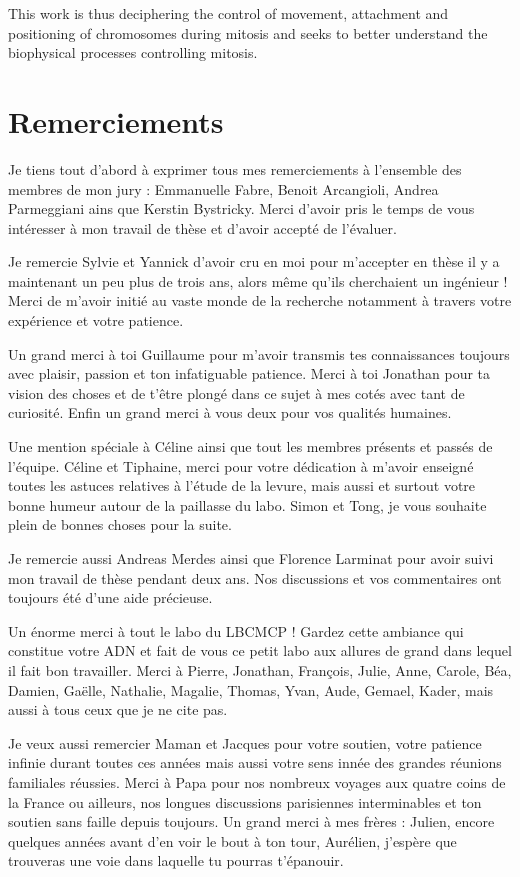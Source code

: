 \documentclass[12pt,a4paper,twoside,openright]{book}
\begin{document}
This work is thus deciphering the control of movement, attachment and
positioning of chromosomes during mitosis and seeks to better understand
the biophysical processes controlling mitosis.

\cleardoublepage
\clearpage\null

\section*{Remerciements}

Je tiens tout d'abord à exprimer tous mes remerciements à l'ensemble des
membres de mon jury : Emmanuelle Fabre, Benoit Arcangioli, Andrea
Parmeggiani ains que Kerstin Bystricky. Merci d'avoir pris le temps de
vous intéresser à mon travail de thèse et d'avoir accepté de l'évaluer.

Je remercie Sylvie et Yannick d'avoir cru en moi pour m'accepter en
thèse il y a maintenant un peu plus de trois ans, alors même qu'ils
cherchaient un ingénieur ! Merci de m'avoir initié au vaste monde de la
recherche notamment à travers votre expérience et votre patience.

Un grand merci à toi Guillaume pour m'avoir transmis tes connaissances
toujours avec plaisir, passion et ton infatiguable patience. Merci à toi
Jonathan pour ta vision des choses et de t'être plongé dans ce sujet à
mes cotés avec tant de curiosité. Enfin un grand merci à vous deux pour
vos qualités humaines.

Une mention spéciale à Céline ainsi que tout les membres présents et
passés de l'équipe. Céline et Tiphaine, merci pour votre dédication à
m'avoir enseigné toutes les astuces relatives à l'étude de la levure,
mais aussi et surtout votre bonne humeur autour de la paillasse du labo.
Simon et Tong, je vous souhaite plein de bonnes choses pour la suite.

Je remercie aussi Andreas Merdes ainsi que Florence Larminat pour avoir
suivi mon travail de thèse pendant deux ans. Nos discussions et vos
commentaires ont toujours été d'une aide précieuse.

Un énorme merci à tout le labo du LBCMCP ! Gardez cette ambiance qui
constitue votre ADN et fait de vous ce petit labo aux allures de grand
dans lequel il fait bon travailler. Merci à Pierre, Jonathan, François,
Julie, Anne, Carole, Béa, Damien, Gaëlle, Nathalie, Magalie, Thomas,
Yvan, Aude, Gemael, Kader, mais aussi à tous ceux que je ne cite pas.

Je veux aussi remercier Maman et Jacques pour votre soutien, votre
patience infinie durant toutes ces années mais aussi votre sens innée
des grandes réunions familiales réussies. Merci à Papa pour nos nombreux
voyages aux quatre coins de la France ou ailleurs, nos longues
discussions parisiennes interminables et ton soutien sans faille depuis
toujours. Un grand merci à mes frères : Julien, encore quelques années
avant d'en voir le bout à ton tour, Aurélien, j'espère que trouveras une
voie dans laquelle tu pourras t'épanouir.
\end{document}

